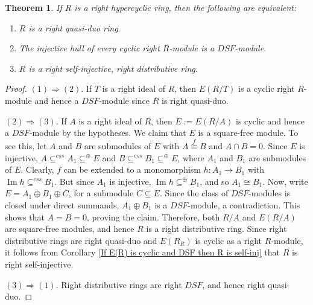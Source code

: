 \documentclass{amsart}
\newtheorem{theorem}{Theorem}[section]
\theoremstyle{plain}
\numberwithin{equation}{section}
\begin{document}
\begin{theorem}
\label{Quasi-duo hypercyclic rings}If $R$ is a right hypercyclic ring, then the following are equivalent: 


\begin{enumerate}
\item $R$ is a right quasi-duo ring. 

\item The injective hull of every cyclic right $R$-module is a $D S F$-module. 

\item $R$ is a right self-injective, right distributive ring. \end{enumerate}
\end{theorem}


\begin{proof}
$(1) \Rightarrow (2)$. If $T$ is a right ideal of $R$, then $E (R/T)$ is a cyclic right $R$-module and hence a $D S F$-module since $R$ is right quasi-duo. 

$(2) \Rightarrow (3)$. If $A$ is a right ideal of $R$, then $E:=E (R/A)$ is cyclic and hence a $D S F$-module by the hypotheses. We claim that $E$ is a square-free module. To see this, let $A$ and $B$ are submodules of $E$ with $A\overset{f}{ \cong }B$ and $A \cap B =0$. Since $E$ is injective, $A  \subseteq ^{e s s}A_{1}  \subseteq ^{ \oplus }E$ and $B  \subseteq ^{e s s}B_{1}  \subseteq ^{ \oplus }E$, where $A_{1}$ and $B_{1}$ are submodules of $E$. Clearly, $f$ can be extended to a monomorphism $h :A_{1} \rightarrow B_{1}$ with $\ensuremath{\operatorname*{Im}}h  \subseteq ^{e s s}B_{1}$. But since $A_{1}$ is injective, $\ensuremath{\operatorname*{Im}}h  \subseteq ^{ \oplus }B_{1}$, and so $A_{1} \cong B_{1}$. Now, write $E =A_{1} \oplus B_{1} \oplus C$, for a submodule $C \subseteq E$. Since the class of $D S F$-modules is closed under direct summands, $A_{1} \oplus B_{1}$ is a $D S F$-module, a contradiction. This shows that $A =B =0$, proving the claim. Therefore, both $R/A$ and $E (R/A)$ are square-free modules, and hence $R$ is a right distributive ring. Since right distributive rings are right quasi-duo and $E (R_{R})$ is cyclic as a right $R$-module, it follows from Corollary \ref{If E(R) is cyclic and DSF then R is self-inj}
that $R$ is right self-injective. 

$(3) \Rightarrow (1)$. Right distributive rings are right $D S F$, and hence right quasi-duo. 
\end{proof}
\end{document}
